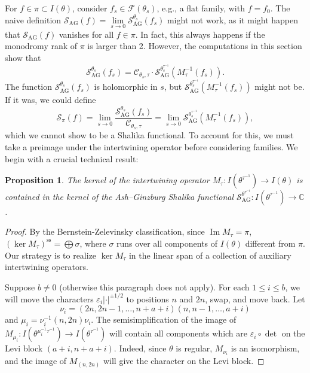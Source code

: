 \documentclass{amsart}
\newtheorem{proposition}[thm]{Proposition}
\theoremstyle{definition}
\renewcommand{\ss}{\operatorname{ss}}
\renewcommand{\Im}{\operatorname{Im}}
\newcommand{\AG}{\operatorname{AG}}
\begin{document}
{For $f\in \pi\subset I(\theta)$, consider $f_s\in
\mathcal{F}(\theta_s)$, e.g., a flat family, with $f=f_0$. The
naive definition $\mathcal{S}_{\AG}(f)=\lim\limits_{s\to
  0}\mathcal{S}_{\AG}^{\theta_s}(f_s)$ might not work, as it
might happen that $\mathcal{S}_{\AG}(f)$ vanishes for all $f\in
\pi$. In fact, this always happens if the monodromy rank of
$\pi$ is larger than 2. However, the computations in this
section show that
\begin{equation}\label{eq:sh-c}
\mathcal{S}_{\AG}^{\theta_s}(f_s)=\mathcal{C}_{\theta_s,\tau}\cdot
\mathcal{S}_{\AG}^{\theta_s^{\tau^{-1}}}(M_\tau^{-1}(f_s)).
\end{equation}
The function $\mathcal{S}_{\AG}^{\theta_s}(f_s)$ is holomorphic in $s$, but 
$\mathcal{S}_{\AG}^{\theta_s^{\tau^{-1}}}(M_\tau^{-1}(f_s))$
might not be. If it was, we could define
\[\mathcal{S}_\pi(f)=\lim_{s\to
  0}\frac{\mathcal{S}^{\theta_s}_{\AG}(f_s)}{\mathcal{C}_{\theta_s,\tau}}=\lim_{s\to
  0}\mathcal{S}_{\AG}^{\theta_s^{\tau^{-1}}}(M_\tau^{-1}(f_s)),\]
which we cannot show to be a Shalika functional. To account for this, we must take a preimage under the
intertwining operator before considering families. We begin with a crucial technical result:
\begin{proposition}\label{p:kerT}
The kernel of the intertwining operator $M_\tau:I(\theta^{\tau^{-1}})\to  I(\theta)$ is contained in the kernel of the Ash--Ginzburg Shalika functional $\mathcal{S}_{\AG}^{\theta^{\tau^{-1}}}:I(\theta^{\tau^{-1}})\to \mathbb{C}$.
\end{proposition}
\begin{proof}
By the Bernstein-Zelevinsky classification, since $\Im
M_\tau=\pi$, $(\ker M_\tau)^{\ss}=\bigoplus \sigma$, where
$\sigma$ runs over all components of $ I(\theta)$ different
from $\pi$. Our strategy is to realize $\ker M_\tau$ in
the linear span of a collection of auxiliary intertwining
operators.

Suppose $b\neq 0$ (otherwise this paragraph does not apply). For
each $1\leqslant i\leqslant b$, we will move the characters $\varepsilon_i|\cdot|^{\pm 1/2}$ to positions $n$ and $2n$, swap, and move back. Let
\[\nu_i = (2n,2n-1,\ldots,n+a+i)(n,n-1,\ldots, a+i)\]
and $\mu_i = \nu_i^{-1}(n,2n)\nu_i$. The semisimplification of
the image of $M_{\mu_i}: I(\theta^{\mu_i^{-1}\tau^{-1}})\to
I(\theta^{\tau^{-1}})$ will contain all components which
are $\varepsilon_i\circ\det$ on the Levi block $(a+i,n+a+i)$. Indeed,
since $\theta$ is regular, $M_{\nu_i}$ is an isomorphism, and
the image of $M_{(n,2n)}$ will give the character on the Levi
block.


\end{proof}}
\end{document}
